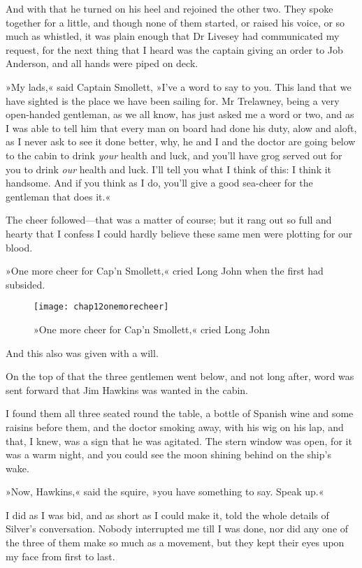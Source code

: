 And with that he turned on his heel and rejoined the other two. They spoke together for a little, and though none of them started, or raised his voice, or so much as whistled, it was plain enough that Dr Livesey had communicated my request, for the next thing that I heard was the captain giving an order to Job Anderson, and all hands were piped on deck.

»My lads,« said Captain Smollett, »I've a word to say to you. This land that we have sighted is the place we have been sailing for. Mr Trelawney, being a very open-handed gentleman, as we all know, has just asked me a word or two, and as I was able to tell him that every man on board had done his duty, alow and aloft, as I never ask to see it done better, why, he and I and the doctor are going below to the cabin to drink \textit{your} health and luck, and you'll have grog served out for you to drink \textit{our} health and luck. I'll tell you what I think of this: I think it handsome. And if you think as I do, you'll give a good sea-cheer for the gentleman that does it.«

The cheer followed—that was a matter of course; but it rang out so full and hearty that I confess I could hardly believe these same men were plotting for our blood.

»One more cheer for Cap'n Smollett,« cried Long John when the first had subsided.

 \begin{sidewaysfigure}
\texttt{[image: chap12onemorecheer]}%
\caption{»One more cheer for Cap'n Smollett,« cried Long John}
\end{sidewaysfigure} 

And this also was given with a will.

On the top of that the three gentlemen went below, and not long after, word was sent forward that Jim Hawkins was wanted in the cabin.

I found them all three seated round the table, a bottle of Spanish wine and some raisins before them, and the doctor smoking away, with his wig on his lap, and that, I knew, was a sign that he was agitated. The stern window was open, for it was a warm night, and you could see the moon shining behind on the ship's wake.

»Now, Hawkins,« said the squire, »you have something to say. Speak up.«

I did as I was bid, and as short as I could make it, told the whole details of Silver's conversation. Nobody interrupted me till I was done, nor did any one of the three of them make so much as a movement, but they kept their eyes upon my face from first to last.

